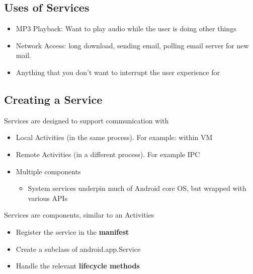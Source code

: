 \documentclass{article}
\begin{document}
\subsection{Uses of Services}
\begin{itemize}
  \item MP3	Playback: Want to play audio while the user is doing other things
  \item Network Access: long download, sending email, polling email server for new mail.
  \item Anything	that	you	don’t	want	to	interrupt	the	user	experience	for
\end{itemize}

\subsection{Creating a Service}
Services	are	designed	to	support	communication	with
\begin{itemize}
  \item Local	Activities	(in	the	same	process). For example: within	VM
  \item Remote	Activities	(in	a	different	process). For example IPC
  \item Multiple	components
  \begin{itemize}
    \item System services	underpin	much	of	Android	core	OS,	but	wrapped	with	various	APIs
  \end{itemize}
\end{itemize}
Services	are	components,	similar	to	an	Activities
\begin{itemize}
  \item Register	the	service	in	the	\textbf{manifest}
  \item Create	a	subclass	of	android.app.Service
  \item Handle	the	relevant	\textbf{lifecycle	methods}
\end{itemize}
\end{document}
